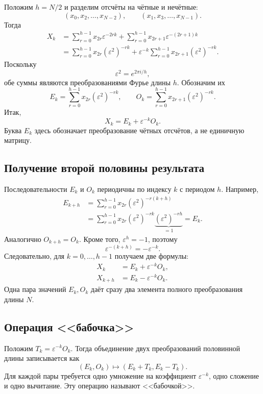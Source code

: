\documentclass[12pt,a4paper]{article}
\theoremstyle{definition}
\theoremstyle{remark}
\newcommand{\eps}{\varepsilon}
\begin{document}
Положим $h=N/2$ и разделим отсчёты на чётные и нечётные:
\[
  (x_0,x_2,\dots,x_{N-2}),\qquad
  (x_1,x_3,\dots,x_{N-1}).
\]
Тогда
\begin{align*}
  X_k
  &=\sum_{r=0}^{h-1}x_{2r}\eps^{-2rk}
    +\sum_{r=0}^{h-1}x_{2r+1}\eps^{-(2r+1)k}\\
  &=\sum_{r=0}^{h-1}x_{2r}(\eps^2)^{-rk}
    +\eps^{-k}\sum_{r=0}^{h-1}x_{2r+1}(\eps^2)^{-rk}.
\end{align*}
Поскольку
\[
  \eps^2=e^{2\pi i/h},
\]
обе суммы являются преобразованиями Фурье длины $h$. Обозначим их
\[
  E_k=\sum_{r=0}^{h-1}x_{2r}(\eps^2)^{-rk},\qquad
  O_k=\sum_{r=0}^{h-1}x_{2r+1}(\eps^2)^{-rk}.
\]
Итак,
\[
  X_k=E_k+\eps^{-k}O_k.
\]
Буква $E_k$ здесь обозначает преобразование чётных отсчётов, а не
единичную матрицу.

\subsection{Получение второй половины результата}

Последовательности $E_k$ и $O_k$ периодичны по индексу $k$ с периодом
$h$. Например,
\begin{align*}
  E_{k+h}
  &=\sum_{r=0}^{h-1}x_{2r}(\eps^2)^{-r(k+h)}\\
  &=\sum_{r=0}^{h-1}x_{2r}(\eps^2)^{-rk}
    \underbrace{(\eps^2)^{-rh}}_{=1}=E_k.
\end{align*}
Аналогично $O_{k+h}=O_k$. Кроме того, $\eps^h=-1$, поэтому
\[
  \eps^{-(k+h)}=-\eps^{-k}.
\]
Следовательно, для $k=0,\dots,h-1$ получаем две формулы:
\[
  \boxed{\begin{aligned}
    X_k&=E_k+\eps^{-k}O_k,\\
    X_{k+h}&=E_k-\eps^{-k}O_k.
  \end{aligned}}
\]
Одна пара значений $E_k,O_k$ даёт сразу два элемента полного
преобразования длины $N$.

\subsection{Операция <<бабочка>>}

Положим $T_k=\eps^{-k}O_k$. Тогда объединение двух преобразований
половинной длины записывается как
\[
  (E_k,O_k)\longmapsto(E_k+T_k,E_k-T_k).
\]
Для каждой пары требуется одно умножение на коэффициент $\eps^{-k}$,
одно сложение и одно вычитание. Эту операцию называют <<бабочкой>>.
\end{document}
